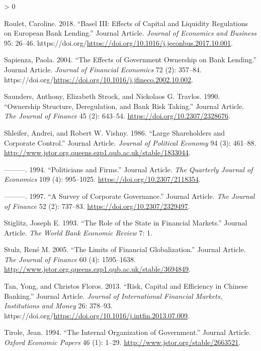 \documentclass{article}
\newlength{\cslhangindent}
\newenvironment{CSLReferences}[2] %
 {%
  \setlength{\parindent}{0pt}
  \ifodd #1 \everypar{\setlength{\hangindent}{\cslhangindent}}\ignorespaces\fi
  \ifnum #2 > 0
  \setlength{\parskip}{#2\baselineskip}
  \fi
 }%
 {}
\begin{document}
\begin{CSLReferences}{1}{0}
\leavevmode\hypertarget{ref-RN68}{}%
Roulet, Caroline. 2018. {``Basel III: Effects of Capital and Liquidity
Regulations on European Bank Lending.''} Journal Article. \emph{Journal
of Economics and Business} 95: 26--46.
https://doi.org/\url{https://doi.org/10.1016/j.jeconbus.2017.10.001}.

\leavevmode\hypertarget{ref-RN69}{}%
Sapienza, Paola. 2004. {``The Effects of Government Ownership on Bank
Lending.''} Journal Article. \emph{Journal of Financial Economics} 72
(2): 357--84.
https://doi.org/\url{https://doi.org/10.1016/j.jfineco.2002.10.002}.

\leavevmode\hypertarget{ref-RN70}{}%
Saunders, Anthony, Elizabeth Strock, and Nickolaos G. Travlos. 1990.
{``Ownership Structure, Deregulation, and Bank Risk Taking.''} Journal
Article. \emph{The Journal of Finance} 45 (2): 643--54.
\url{https://doi.org/10.2307/2328676}.

\leavevmode\hypertarget{ref-RN71}{}%
Shleifer, Andrei, and Robert W. Vishny. 1986. {``Large Shareholders and
Corporate Control.''} Journal Article. \emph{Journal of Political
Economy} 94 (3): 461--88.
\url{http://www.jstor.org.queens.ezp1.qub.ac.uk/stable/1833044}.

\leavevmode\hypertarget{ref-RN72}{}%
---------. 1994. {``Politicians and Firms.''} Journal Article. \emph{The
Quarterly Journal of Economics} 109 (4): 995--1025.
\url{https://doi.org/10.2307/2118354}.

\leavevmode\hypertarget{ref-RN4}{}%
---------. 1997. {``A Survey of Corporate Governance.''} Journal
Article. \emph{The Journal of Finance} 52 (2): 737--83.
\url{https://doi.org/10.2307/2329497}.

\leavevmode\hypertarget{ref-RN73}{}%
Stiglitz, Joseph E. 1993. {``The Role of the State in Financial
Markets.''} Journal Article. \emph{The World Bank Economic Review} 7: 1.

\leavevmode\hypertarget{ref-RN74}{}%
Stulz, René M. 2005. {``The Limits of Financial Globalization.''}
Journal Article. \emph{The Journal of Finance} 60 (4): 1595--1638.
\url{http://www.jstor.org.queens.ezp1.qub.ac.uk/stable/3694849}.

\leavevmode\hypertarget{ref-RN75}{}%
Tan, Yong, and Christos Floros. 2013. {``Risk, Capital and Efficiency in
Chinese Banking.''} Journal Article. \emph{Journal of International
Financial Markets, Institutions and Money} 26: 378--93.
https://doi.org/\url{https://doi.org/10.1016/j.intfin.2013.07.009}.

\leavevmode\hypertarget{ref-RN76}{}%
Tirole, Jean. 1994. {``The Internal Organization of Government.''}
Journal Article. \emph{Oxford Economic Papers} 46 (1): 1--29.
\url{http://www.jstor.org/stable/2663521}.


\end{CSLReferences}
\end{document}
